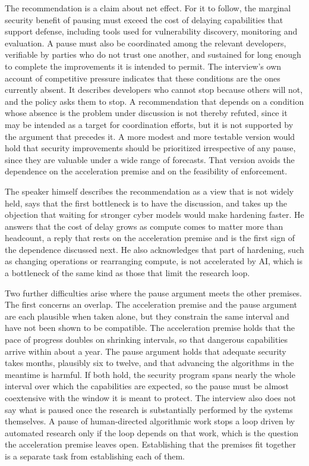 \documentclass[11pt]{article}
\begin{document}
The recommendation is a claim about net effect. For it to follow, the marginal security benefit of pausing must exceed the cost of delaying capabilities that support defense, including tools used for vulnerability discovery, monitoring and evaluation. A pause must also be coordinated among the relevant developers, verifiable by parties who do not trust one another, and sustained for long enough to complete the improvements it is intended to permit. The interview's own account of competitive pressure indicates that these conditions are the ones currently absent. It describes developers who cannot stop because others will not, and the policy asks them to stop. A recommendation that depends on a condition whose absence is the problem under discussion is not thereby refuted, since it may be intended as a target for coordination efforts, but it is not supported by the argument that precedes it. A more modest and more testable version would hold that security improvements should be prioritized irrespective of any pause, since they are valuable under a wide range of forecasts. That version avoids the dependence on the acceleration premise and on the feasibility of enforcement.

The speaker himself describes the recommendation as a view that is not widely held, says that the first bottleneck is to have the discussion, and takes up the objection that waiting for stronger cyber models would make hardening faster. He answers that the cost of delay grows as compute comes to matter more than headcount, a reply that rests on the acceleration premise and is the first sign of the dependence discussed next. He also acknowledges that part of hardening, such as changing operations or rearranging compute, is not accelerated by AI, which is a bottleneck of the same kind as those that limit the research loop.

Two further difficulties arise where the pause argument meets the other premises. The first concerns an overlap. The acceleration premise and the pause argument are each plausible when taken alone, but they constrain the same interval and have not been shown to be compatible. The acceleration premise holds that the pace of progress doubles on shrinking intervals, so that dangerous capabilities arrive within about a year. The pause argument holds that adequate security takes months, plausibly six to twelve, and that advancing the algorithms in the meantime is harmful. If both hold, the security program spans nearly the whole interval over which the capabilities are expected, so the pause must be almost coextensive with the window it is meant to protect. The interview also does not say what is paused once the research is substantially performed by the systems themselves. A pause of human-directed algorithmic work stops a loop driven by automated research only if the loop depends on that work, which is the question the acceleration premise leaves open. Establishing that the premises fit together is a separate task from establishing each of them.
\end{document}
